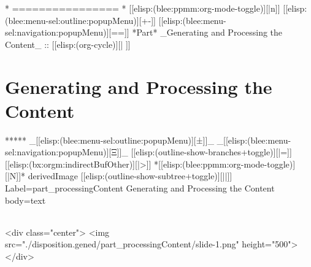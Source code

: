 \begin{whenOrg}
\begin{verblatex}
\begin{frame}[fragile,label=frameBodyTypes]


\end{frame}
\end{verblatex}


\begin{whenOrg}
*      ================
*  [[elisp:(blee:ppmm:org-mode-toggle)][|n]] [[elisp:(blee:menu-sel:outline:popupMenu)][+-]] [[elisp:(blee:menu-sel:navigation:popupMenu)][==]]  *Part*   _Generating and Processing the Content_ ::  [[elisp:(org-cycle)][| ]]
\end{whenOrg}

\newpage
\part{Generating and Processing the Content}

\begin{whenOrg}
*****  _[[elisp:(blee:menu-sel:outline:popupMenu)][±]]_ _[[elisp:(blee:menu-sel:navigation:popupMenu)][Ξ]]_ [[elisp:(outline-show-branches+toggle)][|=]] [[elisp:(bx:orgm:indirectBufOther)][|>]] *[[elisp:(blee:ppmm:org-mode-toggle)][|N]]*  derivedImage [[elisp:(outline-show-subtree+toggle)][||]] Label=part_processingContent Generating and Processing the Content body=text
\end{whenOrg}

\begin{htmlonly}

\begin{frame}[fragile,plain,label=part_processingContent]
    \frametitle{}
    \framesubtitle{}
    \begin{rawhtml}
<div class="center">
<img src="./disposition.gened/part_processingContent/slide-1.png" height="500">
</div>
    \end{rawhtml}
\end{frame}
\end{htmlonly}


\end{whenOrg}
